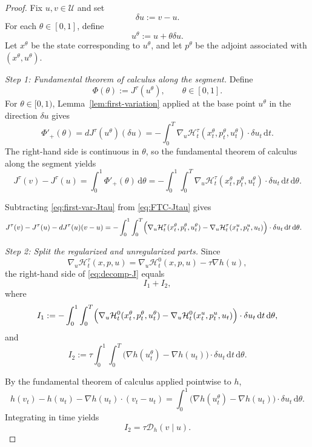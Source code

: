 \documentclass[11pt]{amsart}
\theoremstyle{plain}
\theoremstyle{definition}
\theoremstyle{remark}
\newcommand{\dd}{\,\mathrm{d}}
\begin{document}
\begin{proof}
Fix $u,v\in\mathcal U$ and set
\[
\delta u := v-u.
\]
For each $\theta\in[0,1]$, define
\[
u^\theta := u+\theta \delta u.
\]
Let $x^\theta$ be the state corresponding to $u^\theta$, and let $p^\theta$ be the adjoint associated with
$(x^\theta,u^\theta)$.

\smallskip

\noindent
\textit{Step 1: Fundamental theorem of calculus along the segment.}
Define
\[
\Phi(\theta):=J^\tau(u^\theta), \qquad \theta\in[0,1].
\]
For $\theta\in[0,1)$, Lemma~\ref{lem:first-variation} applied at the base point $u^\theta$ in the direction $\delta u$ gives
\[
\Phi'_+(\theta)=dJ^\tau(u^\theta)(\delta u)
=
-\int_0^T
\nabla_u \mathcal H_t^\tau(x_t^\theta,p_t^\theta,u_t^\theta)\cdot \delta u_t\dd t.
\]
The right-hand side is continuous in $\theta$, so the fundamental theorem of calculus along the segment yields
\begin{equation}\label{eq:FTC-Jtau}
J^\tau(v)-J^\tau(u)
=
\int_0^1 \Phi'_+(\theta)\dd\theta
=
-\int_0^1\int_0^T
\nabla_u \mathcal H_t^\tau(x_t^\theta,p_t^\theta,u_t^\theta)\cdot \delta u_t\dd t\dd\theta.
\end{equation}

Subtracting \eqref{eq:first-var-Jtau} from \eqref{eq:FTC-Jtau} gives
\begin{equation}\label{eq:decomp-J}
\begin{aligned}
J^\tau(v)-J^\tau(u)-dJ^\tau(u)(v-u)
&=
-\int_0^1\int_0^T
\Bigl(
\nabla_u \mathcal H_t^\tau(x_t^\theta,p_t^\theta,u_t^\theta)
-
\nabla_u \mathcal H_t^\tau(x_t^u,p_t^u,u_t)
\Bigr)\cdot \delta u_t\dd t\dd \theta.
\end{aligned}
\end{equation}

\smallskip

\noindent
\textit{Step 2: Split the regularized and unregularized parts.}
Since
\[
\nabla_u \mathcal H_t^\tau(x,p,u)=\nabla_u \mathcal H_t^0(x,p,u) - \tau \nabla h(u),
\]
the right-hand side of \eqref{eq:decomp-J} equals
\[
I_1+I_2,
\]
where
\[
I_1:=
-\int_0^1\int_0^T
\Bigl(
\nabla_u \mathcal H_t^0(x_t^\theta,p_t^\theta,u_t^\theta)
-
\nabla_u \mathcal H_t^0(x_t^u,p_t^u,u_t)
\Bigr)\cdot \delta u_t\dd t\dd \theta,
\]
and
\[
I_2:=
\tau\int_0^1\int_0^T
\bigl(\nabla h(u_t^\theta)-\nabla h(u_t)\bigr)\cdot \delta u_t\dd t\dd \theta.
\]

By the fundamental theorem of calculus applied pointwise to $h$,
\[
h(v_t)-h(u_t)-\nabla h(u_t)\cdot (v_t-u_t)
=
\int_0^1
\bigl(\nabla h(u_t^\theta)-\nabla h(u_t)\bigr)\cdot \delta u_t\dd\theta.
\]
Integrating in time yields
\[
I_2
=
\tau \mathcal{D}_h(v\mid u).
\]


\end{proof}
\end{document}
